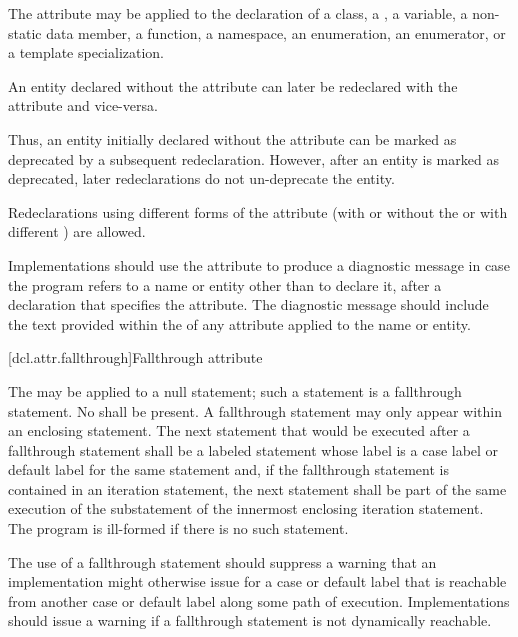 \pnum
The attribute may be applied to the declaration of
a class,
a ,
a variable,
a non-static data member,
a function,
a namespace,
an enumeration,
an enumerator, or
a template specialization.

\pnum
An entity declared without the  attribute can later be redeclared
with the attribute and vice-versa.
\begin{note}
Thus, an entity initially declared without the
attribute can be marked as deprecated by a subsequent redeclaration. However, after an entity
is marked as deprecated, later redeclarations do not un-deprecate the entity.
\end{note}
Redeclarations using different forms of the attribute (with or without the
 or with different
) are allowed.

\pnum
\recommended
Implementations should use the  attribute to produce a diagnostic
message in case the program refers to a name or entity other than to declare it, after a
declaration that specifies the attribute. The diagnostic message should include the text provided
within the  of any  attribute applied
to the name or entity.

[dcl.attr.fallthrough]{Fallthrough attribute}

\pnum
The  
may be applied to a null statement;
such a statement is a fallthrough statement.
No  shall be present.
A fallthrough statement may only appear within
an enclosing  statement.
The next statement that would be executed after a fallthrough statement
shall be a labeled statement whose label is a case label or
default label for the same  statement and,
if the fallthrough statement is contained in an iteration statement,
the next statement shall be part of the same execution of
the substatement of the innermost enclosing iteration statement.
The program is ill-formed if there is no such statement.

\pnum
\recommended
The use of a fallthrough statement should suppress
a warning that an implementation might otherwise issue
for a case or default label that is reachable
from another case or default label along some path of execution.
Implementations should issue a warning
if a fallthrough statement is not dynamically reachable.

